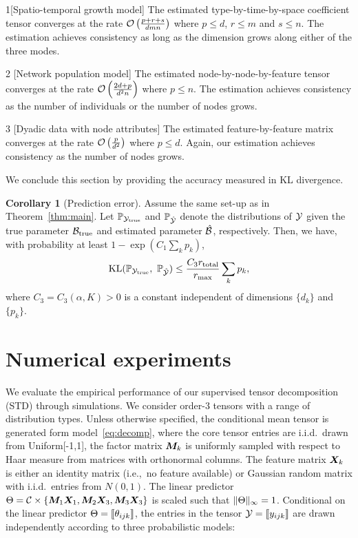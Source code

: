 \documentclass[12pt]{article}
\theoremstyle{definition}
\newtheorem{cor}{Corollary}[section]
\theoremstyle{definition}
\begin{document}
\begin{customexample}{1}[Spatio-temporal growth model] The estimated type-by-time-by-space coefficient tensor converges at the rate $\mathcal{O}\left(\frac{p+r+s}{dmn}\right)$ where $p\leq d$, $r\leq m$ and $s\leq n$. The estimation achieves consistency as long as the dimension grows along either of the three modes.
\end{customexample}

\begin{customexample}{2} [Network population model] The estimated node-by-node-by-feature tensor converges at the rate $\mathcal{O}\left(\frac{2d+p}{d^2n}\right)$ where $p\leq n$. The estimation achieves consistency as the number of individuals or the number of nodes grows. 
\end{customexample}

\begin{customexample}{3} [Dyadic data with node attributes] The estimated feature-by-feature matrix converges at the rate $\mathcal{O}\left(\frac{p}{d^2}\right)$ where $p\leq d$. Again, our estimation achieves consistency as the number of nodes grows. 
\end{customexample}

We conclude this section by providing the accuracy measured in KL divergence.

\begin{cor}[Prediction error]\label{thm:KL}
Assume the same set-up as in Theorem~\ref{thm:main}. Let $\mathbb{P}_{\mathcal{Y}_{\textup{true}}}$ and $\mathbb{P}_{\hat {\mathcal{Y}}}$ denote the distributions of $\mathcal{Y}$ given the true parameter $\mathcal{B}_{\textup{true}}$ and estimated parameter $\hat {\mathcal{B}}$, respectively. Then, we have, with probability at least $1-\exp(C_1\sum_k p_k)$,
\[
\textup{KL}(\mathbb{P}_{\tY_{\textup{true}}},\ \mathbb{P}_{\hat \tY})\leq \frac{C_3r_{\textup{total}}}{r_{\max}}\sum_k p_k,
\]
where $C_3=C_3(\alpha, K)>0$ is a constant independent of dimensions $\{d_k\}$ and $\{p_k\}$.
\end{cor}

\section{Numerical experiments}\label{sec:simulation}
We evaluate the empirical performance of our supervised tensor decomposition (STD) through simulations. We consider order-3 tensors with a range of distribution types. Unless otherwise specified, the conditional mean tensor is generated form model~\eqref{eq:decomp}, where the core tensor entries are i.i.d.\ drawn from Uniform[-1,1], the factor matrix $\bm M_k$ is uniformly sampled with respect to Haar measure from matrices with orthonormal columns. The feature matrix $\bm X_k$ is either an identity matrix (i.e.,\ no feature  available) or Gaussian random matrix with i.i.d.\ entries from $N(0,1)$. The linear predictor $\Theta=\mathcal{C}\times\{\bm M_1\bm X_1,\bm M_2\bm X_3,\bm M_3\bm X_3\}$ is scaled such that $\lVert\Theta\rVert_\infty=1$. Conditional on the linear predictor $\Theta=\llbracket \theta_{ijk} \rrbracket$, the entries in the tensor $\mathcal{Y}=\llbracket y_{ijk} \rrbracket$ are drawn independently according to three probabilistic models:
\end{document}
